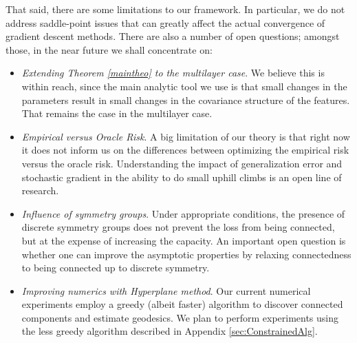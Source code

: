 That said, there are some limitations to our framework. In particular, we do not address saddle-point issues that can greatly affect the actual convergence of gradient descent methods. There are also a number of open questions; amongst those, in the near future we shall concentrate on:
\begin{itemize}
\item \emph{Extending Theorem \ref{maintheo} to the multilayer case}. We believe this is within reach, since the main analytic tool we use is that small changes in the parameters result in small changes in the covariance structure of the features. That remains the case in the multilayer case. 
\item \emph{Empirical versus Oracle Risk}. A big limitation of our theory is that right now it does not inform us on the differences between optimizing the empirical risk versus the oracle risk. Understanding the impact of generalization error and stochastic gradient in the ability to do small uphill climbs is an open line of research.
\item \emph{Influence of symmetry groups}.  Under appropriate conditions, the presence of discrete symmetry groups does not prevent the loss from being connected, but at the expense of increasing the capacity. An important open question is whether one can improve the asymptotic properties by relaxing connectedness to being connected up to discrete symmetry. 
\item \emph{Improving numerics with Hyperplane method}. Our current numerical experiments employ a greedy (albeit faster) algorithm to discover connected components and estimate geodesics. We plan to perform experiments using the less greedy algorithm described in Appendix \ref{sec:ConstrainedAlg}. 
\end{itemize}
 

%
